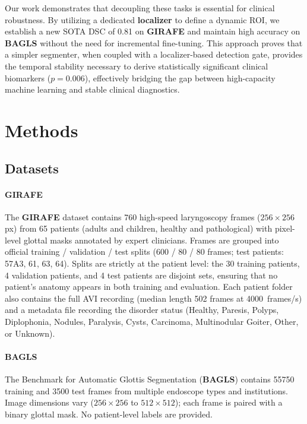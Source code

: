 \documentclass[preprint,12pt]{elsarticle}
\newcommand{\girafe}{\textbf{GIRAFE}}
\newcommand{\bagls}{\textbf{BAGLS}}
\begin{document}
Our work demonstrates that decoupling these tasks is essential for clinical
robustness. By utilizing a dedicated \textbf{localizer} to define a dynamic ROI,
we establish a new SOTA DSC of \num{0.81} on \girafe{} and maintain high
accuracy on \bagls{} without the need for incremental fine-tuning.
This approach proves that a simpler segmenter, when coupled with a
localizer-based detection gate, provides the temporal stability necessary to
derive statistically significant clinical biomarkers ($p{=}0.006$),
effectively bridging the gap between high-capacity machine learning and stable
clinical diagnostics.

\section{Methods}
\label{sec:method}

\subsection{Datasets}
\label{sec:datasets}

\paragraph{\girafe{}}
The \girafe{} dataset \cite{andrade2025datainbrief} contains \num{760}
high-speed laryngoscopy frames (\(256\times256\) px) from \num{65} patients
(adults and children, healthy and pathological) with pixel-level glottal masks
annotated by expert clinicians.
Frames are grouped into official training / validation / test splits (\num{600}
/ \num{80} / \num{80} frames; test patients: 57A3, 61, 63, 64).
Splits are strictly at the patient level: the \num{30} training patients,
\num{4} validation patients, and \num{4} test patients are disjoint sets,
ensuring that no patient's anatomy appears in both training and evaluation.
Each patient folder also contains the full AVI recording (median length
\num{502} frames at \SI{4000}{frames/s}) and a metadata file recording the disorder
status (Healthy, Paresis, Polyps, Diplophonia, Nodules, Paralysis, Cysts,
Carcinoma, Multinodular Goiter, Other, or Unknown).

\paragraph{\bagls{}}
The Benchmark for Automatic Glottis Segmentation (\bagls{}) \cite{gomez2020bagls}
contains \num{55750} training and \num{3500} test frames from multiple
endoscope types and institutions.
Image dimensions vary (\(256\times256\) to \(512\times512\)); each frame is
paired with a binary glottal mask.
No patient-level labels are provided.
\end{document}
